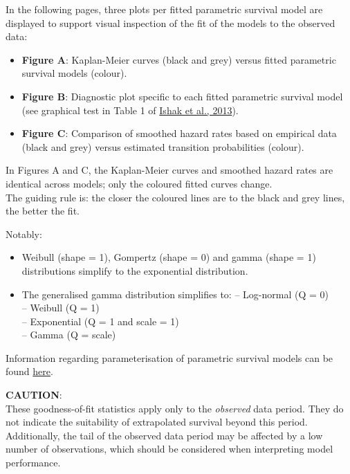 \documentclass[
]{article}
\providecommand{\tightlist}{%
  \setlength{\itemsep}{0pt}\setlength{\parskip}{0pt}}
\begin{document}
In the following pages, three plots per fitted parametric survival model
are displayed to support visual inspection of the fit of the models to
the observed data:

\begin{itemize}
\tightlist
\item
  \textbf{Figure A}: Kaplan-Meier curves (black and grey) versus fitted
  parametric survival models (colour).\\
\item
  \textbf{Figure B}: Diagnostic plot specific to each fitted parametric
  survival model (see graphical test in Table 1 of
  \href{https://doi.org/10.1007/s40273-013-0064-3}{Ishak et al., 2013}).
\item
  \textbf{Figure C}: Comparison of smoothed hazard rates based on
  empirical data (black and grey) versus estimated transition
  probabilities (colour).
\end{itemize}

In Figures A and C, the Kaplan-Meier curves and smoothed hazard rates
are identical across models; only the coloured fitted curves change.\\
The guiding rule is: the closer the coloured lines are to the black and
grey lines, the better the fit.

Notably:

\begin{itemize}
\tightlist
\item
  Weibull (shape = 1), Gompertz (shape = 0) and gamma (shape = 1)
  distributions simplify to the exponential distribution.\\
\item
  The generalised gamma distribution simplifies to: -- Log-normal (Q =
  0)\\
  -- Weibull (Q = 1)\\
  -- Exponential (Q = 1 and scale = 1)\\
  -- Gamma (Q = scale)
\end{itemize}

Information regarding parameterisation of parametric survival models can
be found
\href{https://devinincerti.com/code/survival-distributions.html}{here}.

\textbf{CAUTION}:\\
These goodness-of-fit statistics apply only to the \emph{observed} data
period. They do not indicate the suitability of extrapolated survival
beyond this period. Additionally, the tail of the observed data period
may be affected by a low number of observations, which should be
considered when interpreting model performance.
\end{document}
